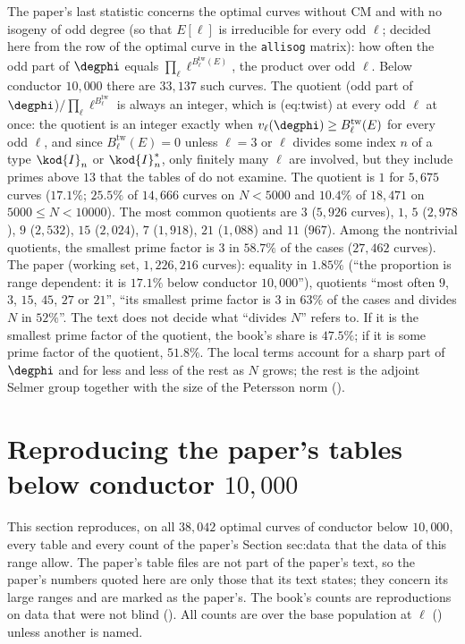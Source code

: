 \begin{sloppypar}
\begin{example}\label{ex:computation:odd-part}
The paper's last statistic concerns the optimal curves without CM and with no isogeny of odd degree (so that $E[\ell]$ is irreducible for every odd
$\ell$; decided here from the row of the optimal curve in the \texttt{allisog} matrix): how often the odd part of $\degphi$ equals $\prod_\ell\ell^{B^{\mathrm{tw}}_\ell(E)}$, the
product over odd $\ell$. Below conductor $10{,}000$ there are $33{,}137$ such curves. The quotient (odd part of $\degphi$)$/\prod_\ell\ell^{B^{\mathrm{tw}}_\ell}$ is always an
integer, which is (eq:twist) at every odd $\ell$ at once: the quotient is an integer exactly when $v_\ell(\degphi)\ge B^{\mathrm{tw}}_\ell(E)$ for every odd
$\ell$, and since $B^{\mathrm{tw}}_\ell(E)=0$ unless $\ell=3$ or $\ell$ divides some index $n$ of a type $\kod{I}_n$ or $\kod{I}_n^*$, only finitely many $\ell$ are
involved, but they include primes above $13$ that the tables of  do not examine. The quotient is $1$ for $5{,}675$ curves ($17.1\%$; $25.5\%$ of $14{,}666$ curves on $N<5000$ and $10.4\%$ of
$18{,}471$ on $5000\le N<10000$). The most common quotients are $3$ ($5{,}926$ curves), $1$, $5$ ($2{,}978$), $9$ ($2{,}532$), $15$ ($2{,}024$), $7$ ($1{,}918$), $21$
($1{,}088$) and $11$ ($967$). Among the nontrivial quotients, the smallest prime factor is $3$ in $58.7\%$ of the cases ($27{,}462$ curves). The paper (working
set, $1{,}226{,}216$ curves): equality in $1.85\%$ (``the proportion is range dependent: it is $17.1\%$ below conductor $10{,}000$''), quotients ``most often $9$, $3$,
$15$, $45$, $27$ or $21$'', ``its smallest prime factor is $3$ in $63\%$ of the cases and divides $N$ in $52\%$''. The text does not decide what ``divides $N$'' refers to. If it is
the smallest prime factor of the quotient, the book's share is $47.5\%$; if it is some prime factor of the quotient, $51.8\%$. The local terms account for a sharp part of $\degphi$ and for less and less of the rest as $N$ grows; the rest is the
adjoint Selmer group together with the size of the Petersson norm ().
\end{example}
\section{Reproducing the paper's tables below conductor \texorpdfstring{$10{,}000$}{10,000}}\label{sec:computation:repro}

This section reproduces, on all $38{,}042$ optimal curves of conductor below $10{,}000$, every table and every count of the paper's Section sec:data
that the data of this range allow. The paper's table files are not part of the paper's text, so the paper's numbers quoted here are only those
that its text states; they concern its large ranges and are marked as the paper's. The book's counts are reproductions on data that were not
blind (). All counts are over the base population at $\ell$ () unless another is named.


\end{sloppypar}

